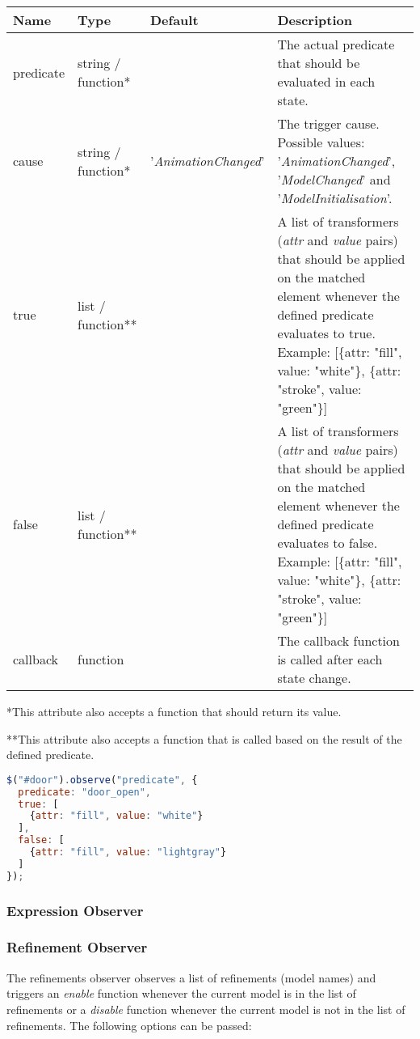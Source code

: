\begin{tabular}{ l l l p{7cm} }
  \textbf{Name} & \textbf{Type} & \textbf{Default} & \textbf{Description} \\
  \hline\noalign{\medskip}
  predicate & string / function* & & The actual predicate that should be evaluated in each state.\\
  \hline\noalign{\medskip}
  cause & string / function* & '\textit{AnimationChanged}' & The trigger cause. Possible values: '\textit{AnimationChanged}', '\textit{ModelChanged}' and '\textit{ModelInitialisation}'. \\
  \hline\noalign{\medskip}
  true & list / function** & & A list of transformers (\textit{attr} and \textit{value} pairs) that should be applied on the matched element whenever the defined predicate evaluates to true. Example: 
  [\{attr: "fill", value: "white"\}, \{attr: "stroke", value: "green"\}]\\
  \hline\noalign{\medskip}
  false & list / function** & & A list of transformers (\textit{attr} and \textit{value} pairs) that should be applied on the matched element whenever the defined predicate evaluates to false. Example: 
  [\{attr: "fill", value: "white"\}, \{attr: "stroke", value: "green"\}]\\
  \hline\noalign{\medskip}
  callback & function &  & The callback function is called after each state change.
\end{tabular}

*This attribute also accepts a function that should return its value.

**This attribute also accepts a function that is called based on the result of the defined predicate.

\begin{lstlisting}[float=ht,language=JavaScript]
$("#door").observe("predicate", {
  predicate: "door_open",
  true: [
    {attr: "fill", value: "white"}
  ],
  false: [
    {attr: "fill", value: "lightgray"}
  ]
});
\end{lstlisting}

\subsubsection{Expression Observer}

\subsubsection{Refinement Observer}

The refinements observer observes a list of refinements (model names) and triggers an \textit{enable} function whenever the current model is in the list of refinements or a \textit{disable} function whenever the current model is not in the list of refinements.
The following options can be passed:

